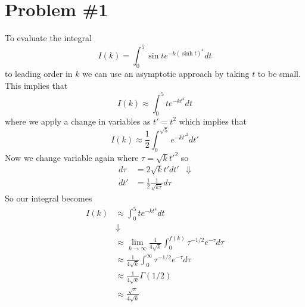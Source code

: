 \documentclass[11pt]{article}
\numberwithin{equation}{section}
\begin{document}


\section{Problem \#1}
To evaluate the integral
$$I(k) = \int_{0}^{5}\sin{t}e^{-k(\sinh{t})^4}dt$$
to leading order in $k$ we can use an asymptotic approach by taking $t$ to be small. This 
implies that
$$I(k) \approx \int_{0}^{5}te^{-kt^4}dt$$
where we apply a change in variables as $t'=t^2$ which implies that
$$I(k) \approx \frac{1}{2}\int_{0}^{\sqrt{5}}e^{-kt'^2}dt'$$
Now we change variable again where $\tau=\sqrt{k}t'^2$ so 
\begin{align*}
d\tau &= 2\sqrt{k}t'dt'
&\Downarrow\\
dt' &= \frac{1}{2}\frac{1}{\sqrt{k\tau}}d\tau
\end{align*}
So our integral becomes
\begin{align*}
I(k) &\approx \int_{0}^{5}te^{-kt^4}dt\\
&\Downarrow\\
&\approx \lim_{k\rightarrow\infty}\frac{1}{4\sqrt{k}}\int_{0}^{f(k)}\tau^{-1/2}e^{-\tau}d\tau\\
&\approx \frac{1}{4\sqrt{k}}\int_{0}^{\infty}\tau^{-1/2}e^{-\tau}d\tau\\
&\approx \frac{1}{4\sqrt{k}}\Gamma(1/2)\\
&\approx \frac{\sqrt{\pi}}{4\sqrt{k}}
\end{align*}

\pagebreak
\end{document}
